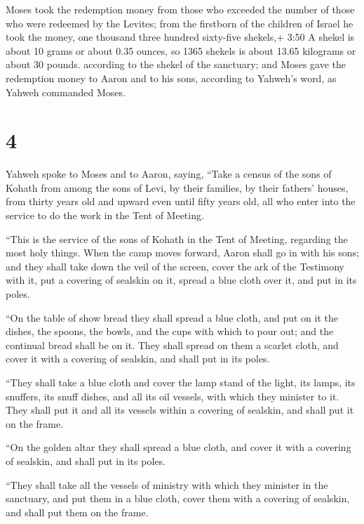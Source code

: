 Moses took the redemption money from those who exceeded
the number of those who were redeemed by the Levites;  from
the firstborn of the children of Israel he took the money, one thousand
three hundred sixty-five shekels,+ 3:50 A shekel is about 10 grams or
about 0.35 ounces, so 1365 shekels is about 13.65 kilograms or about 30
pounds. according to the shekel of the sanctuary;  and
Moses gave the redemption money to Aaron and to his sons, according to
Yahweh's word, as Yahweh commanded Moses.

\hypertarget{section-3}{%
\section{4}\label{section-3}}

 Yahweh spoke to Moses and to Aaron, saying, 
``Take a census of the sons of Kohath from among the sons of Levi, by
their families, by their fathers' houses,  from thirty years
old and upward even until fifty years old, all who enter into the
service to do the work in the Tent of Meeting.

 ``This is the service of the sons of Kohath in the Tent of
Meeting, regarding the most holy things.  When the camp
moves forward, Aaron shall go in with his sons; and they shall take down
the veil of the screen, cover the ark of the Testimony with it,
 put a covering of sealskin on it, spread a blue cloth over
it, and put in its poles.

 ``On the table of show bread they shall spread a blue
cloth, and put on it the dishes, the spoons, the bowls, and the cups
with which to pour out; and the continual bread shall be on it.
 They shall spread on them a scarlet cloth, and cover it
with a covering of sealskin, and shall put in its poles.

 ``They shall take a blue cloth and cover the lamp stand of
the light, its lamps, its snuffers, its snuff dishes, and all its oil
vessels, with which they minister to it.  They shall put it
and all its vessels within a covering of sealskin, and shall put it on
the frame.

 ``On the golden altar they shall spread a blue cloth, and
cover it with a covering of sealskin, and shall put in its poles.

 ``They shall take all the vessels of ministry with which
they minister in the sanctuary, and put them in a blue cloth, cover them
with a covering of sealskin, and shall put them on the frame.

